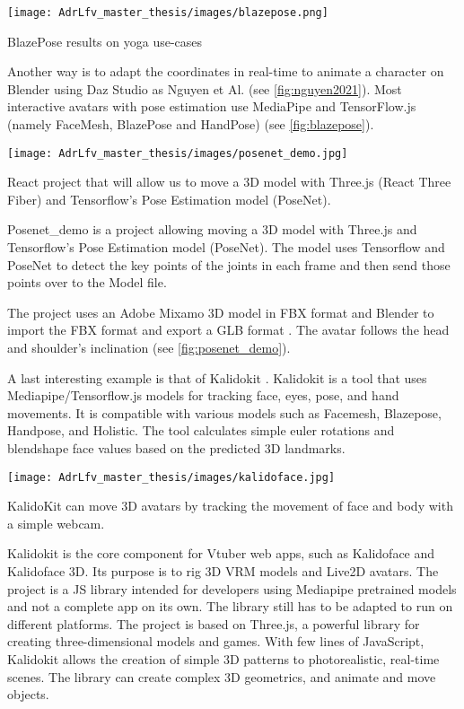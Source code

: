 \begin{marginfigure}
    \centering
    \texttt{[image: AdrLfv\_master\_thesis/images/blazepose.png]}
    \caption{BlazePose results on yoga use-cases}
    \label{fig:blazepose}
\end{marginfigure}

Another way is to adapt the coordinates in real-time to animate a character on Blender using Daz Studio as Nguyen et Al. \cite{nguyen2021automatic} (see \ref{fig:nguyen2021}). Most interactive avatars with pose estimation use MediaPipe and TensorFlow.js (namely FaceMesh, BlazePose and HandPose) \cite{blazepose} (see \ref{fig:blazepose}).

\begin{marginfigure}
    \centering
    \texttt{[image: AdrLfv\_master\_thesis/images/posenet\_demo.jpg]}
    \caption{React project that will allow us to move a 3D model with Three.js (React Three Fiber) and Tensorflow's Pose Estimation model (PoseNet).}
    \label{fig:posenet_demo}
\end{marginfigure}

Posenet\_demo \cite{posenet_demo} is a project allowing moving a 3D model with Three.js and Tensorflow’s Pose Estimation model (PoseNet). The model uses Tensorflow and PoseNet to detect the key points of the joints in each frame and then send those points over to the Model file. 

The project uses an Adobe Mixamo \cite{mixamo} 3D model in FBX format and Blender to import the FBX format and export a GLB format \cite{posenet}. The avatar follows the head and shoulder's inclination (see \ref{fig:posenet_demo}).

A last interesting example is that of Kalidokit \cite{kalidokit}. Kalidokit is a tool that uses Mediapipe/Tensorflow.js models for tracking face, eyes, pose, and hand movements. It is compatible with various models such as Facemesh, Blazepose, Handpose, and Holistic. The tool calculates simple euler rotations and blendshape face values based on the predicted 3D landmarks.

\begin{marginfigure}
    \centering
    \texttt{[image: AdrLfv\_master\_thesis/images/kalidoface.jpg]}
    \caption{KalidoKit can move 3D avatars by tracking the movement of face and body with a simple webcam.}
    \label{fig:kalidoface}
\end{marginfigure}

Kalidokit is the core component for Vtuber web apps, such as Kalidoface and Kalidoface 3D. Its purpose is to rig 3D VRM models and Live2D avatars. The project is a JS library intended for developers using Mediapipe pretrained models and not a complete app on its own. The library still has to be adapted to run on different platforms. The project is based on Three.js, a powerful library for creating three-dimensional models and games. 
With few lines of JavaScript, Kalidokit allows the creation of simple 3D patterns to photorealistic, real-time scenes. The library can create complex 3D geometrics, and animate and move objects.

